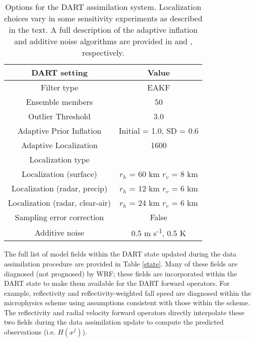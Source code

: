 \begin{table}
\centering
\begin{tabular}{ c || c }
{\bf DART setting} & {\bf Value} \\ \hline \hline
Filter type & EAKF \\ \hline
Ensemble members & 50 \\ \hline
Outlier Threshold & 3.0 \\ \hline
Adaptive Prior Inflation & Initial = 1.0, SD = 0.6 \\ \hline
Adaptive Localization & 1600 \\ \hline
Localization type & \citet{gasparicohn99} \\ \hline
Localization (surface) & \(r_h\) = 60 km \(r_v\) = 8 km \\ \hline
Localization (radar, precip) & \(r_h\) = 12 km \(r_v\) = 6 km \\ \hline
Localization (radar, clear-air) & \(r_h\) = 24 km \(r_v\) = 6 km \\ \hline
Sampling error correction & False \\ \hline
Additive noise & 0.5 m s\textsuperscript{-1}, 0.5 K \\ \hline
\end{tabular}
\caption{Options for the DART assimilation system. Localization choices vary in some sensitivity experiments as described in the text. A full description of the adaptive inflation and additive noise algorithms are provided in \citet{anderson09} and \citet{dowellwicker09}, respectively.}
\label{darttable}
\end{table}

The full list of model fields within the DART state updated during the data assimilation procedure are provided in Table \ref{state}. Many of these fields are diagnosed (not prognosed) by WRF; these fields are incorporated within the DART state to make them available for the DART forward operators. For example, reflectivity and reflectivity-weighted fall speed are diagnosed within the microphysics scheme using assumptions consistent with those within the scheme. The reflectivity and radial velocity forward operators directly interpolate these two fields during the data assimilation update to compute the predicted observations (i.e. \(H(x^f)\)).

